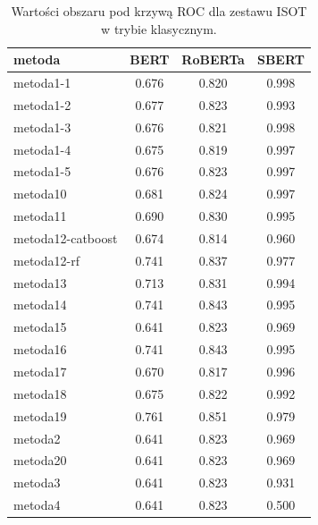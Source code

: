 \begin{table}[H]
	\centering
	\caption{Wartości obszaru pod krzywą ROC dla zestawu ISOT w trybie klasycznym.}
	\label{tab:roc_auc_classic_isot}
	\small
	\begin{tabular}{lccc}
		\toprule
		\textbf{metoda}   & \textbf{BERT} & \textbf{RoBERTa} & \textbf{SBERT} \\
		\midrule
		metoda1-1         & 0.676         & 0.820            & 0.998          \\
		metoda1-2         & 0.677         & 0.823            & 0.993          \\
		metoda1-3         & 0.676         & 0.821            & 0.998          \\
		metoda1-4         & 0.675         & 0.819            & 0.997          \\
		metoda1-5         & 0.676         & 0.823            & 0.997          \\
		metoda10          & 0.681         & 0.824            & 0.997          \\
		metoda11          & 0.690         & 0.830            & 0.995          \\
		metoda12-catboost & 0.674         & 0.814            & 0.960          \\
		metoda12-rf       & 0.741         & 0.837            & 0.977          \\
		metoda13          & 0.713         & 0.831            & 0.994          \\
		metoda14          & 0.741         & 0.843            & 0.995          \\
		metoda15          & 0.641         & 0.823            & 0.969          \\
		metoda16          & 0.741         & 0.843            & 0.995          \\
		metoda17          & 0.670         & 0.817            & 0.996          \\
		metoda18          & 0.675         & 0.822            & 0.992          \\
		metoda19          & 0.761         & 0.851            & 0.979          \\
		metoda2           & 0.641         & 0.823            & 0.969          \\
		metoda20          & 0.641         & 0.823            & 0.969          \\
		metoda3           & 0.641         & 0.823            & 0.931          \\
		metoda4           & 0.641         & 0.823            & 0.500          \\

\end{tabular}
\end{table}
